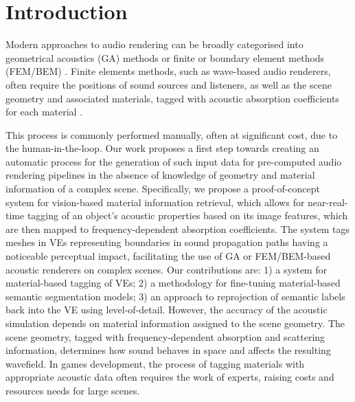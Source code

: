 \section{Introduction}
Modern approaches to audio rendering can be broadly categorised into geometrical acoustics (GA) methods \cite{savioja2015overview} or finite or boundary element methods (FEM/BEM) \cite{hulusic2012acoustic}. Finite elements methods, such as wave-based audio renderers, often require the positions of sound sources and listeners, as well as the scene geometry and associated materials, tagged with acoustic absorption coefficients for each material \cite{deines2006comparative, raghuvanshi2014parametric}. 

This process is commonly performed manually, often at significant cost, due to the human-in-the-loop. Our work proposes a first step towards creating an automatic process for the generation of such input data for pre-computed audio rendering pipelines in the absence of knowledge of geometry and material information of a complex scene. Specifically, we propose a proof-of-concept system for vision-based material information retrieval, which allows for near-real-time tagging of an object's acoustic properties based on its image features, which are then mapped to frequency-dependent absorption coefficients. 
The system tags meshes in VEs representing boundaries in sound propagation paths having a noticeable perceptual impact, facilitating the use of GA or FEM/BEM-based acoustic renderers on complex scenes.
Our contributions are: 1) a system for material-based tagging of VEs; 2) a methodology for fine-tuning material-based semantic segmentation models; 3) an approach to reprojection of semantic labels back into the VE using level-of-detail.
However, the accuracy of the acoustic simulation depends on material information assigned to the scene geometry. The scene geometry, tagged with frequency-dependent absorption and scattering information, determines how sound behaves in space and affects the resulting wavefield. In games development, the process of tagging materials with appropriate acoustic data often requires the work of experts, raising costs and resources needs for large scenes.\par
